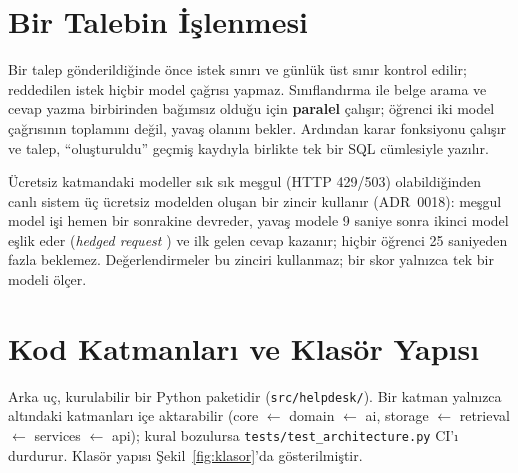\section{Bir Talebin İşlenmesi}

Bir talep gönderildiğinde önce istek sınırı ve günlük üst sınır kontrol edilir; reddedilen istek hiçbir
model çağrısı yapmaz. Sınıflandırma ile belge arama ve cevap yazma birbirinden bağımsız olduğu için
\textbf{paralel} çalışır; öğrenci iki model çağrısının toplamını değil, yavaş olanını bekler. Ardından
karar fonksiyonu çalışır ve talep, ``oluşturuldu'' geçmiş kaydıyla birlikte tek bir SQL cümlesiyle
yazılır.

Ücretsiz katmandaki modeller sık sık meşgul (HTTP 429/503) olabildiğinden canlı sistem üç ücretsiz
modelden oluşan bir zincir kullanır (ADR~0018): meşgul model işi hemen bir sonrakine devreder, yavaş
modele 9 saniye sonra ikinci model eşlik eder (\textit{hedged request} \cite{dean2013}) ve ilk gelen
cevap kazanır; hiçbir öğrenci 25 saniyeden fazla beklemez. Değerlendirmeler bu zinciri kullanmaz; bir
skor yalnızca tek bir modeli ölçer.

\section{Kod Katmanları ve Klasör Yapısı}

Arka uç, kurulabilir bir Python paketidir (\texttt{src/helpdesk/}). Bir katman yalnızca altındaki
katmanları içe aktarabilir (core $\leftarrow$ domain $\leftarrow$ ai, storage $\leftarrow$ retrieval
$\leftarrow$ services $\leftarrow$ api); kural bozulursa \texttt{tests/test\_architecture.py} CI'ı
durdurur. Klasör yapısı Şekil~\ref{fig:klasor}'da gösterilmiştir.


